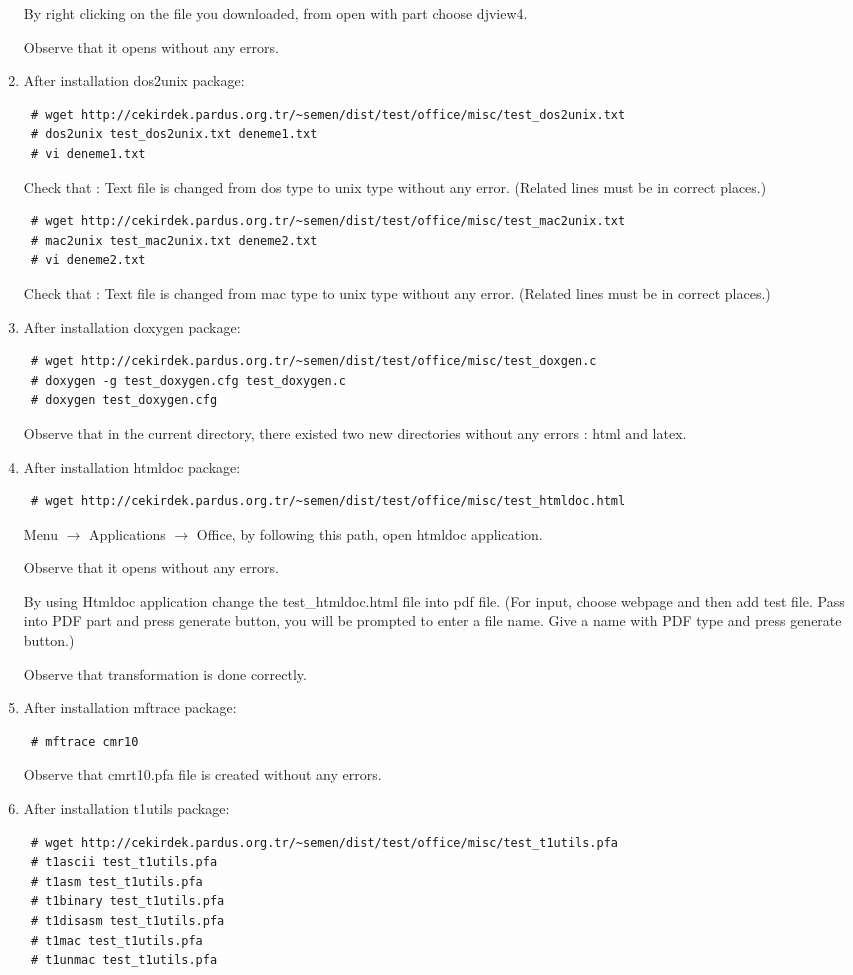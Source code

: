 \documentclass[a4paper,10pt]{article}
\begin{document}
\begin{enumerate}
By right clicking on the file you downloaded, from open with part choose djview4. 

Observe that it opens without any errors.

\item After installation dos2unix package:
\begin{verbatim}
 # wget http://cekirdek.pardus.org.tr/~semen/dist/test/office/misc/test_dos2unix.txt
 # dos2unix test_dos2unix.txt deneme1.txt
 # vi deneme1.txt
\end{verbatim}
Check that : Text file is changed from dos type to unix type without any error. (Related lines must be in  correct places.)

\begin{verbatim}
 # wget http://cekirdek.pardus.org.tr/~semen/dist/test/office/misc/test_mac2unix.txt
 # mac2unix test_mac2unix.txt deneme2.txt
 # vi deneme2.txt
\end{verbatim}
Check that : Text file is changed from mac type to unix type without any error. (Related lines must be in  correct places.)

\item After installation doxygen package:
\begin{verbatim}
 # wget http://cekirdek.pardus.org.tr/~semen/dist/test/office/misc/test_doxgen.c
 # doxygen -g test_doxygen.cfg test_doxygen.c
 # doxygen test_doxygen.cfg
\end{verbatim}

Observe that in the current directory, there existed two new directories without any errors : html and latex.

\item After installation htmldoc package:
\begin{verbatim}
 # wget http://cekirdek.pardus.org.tr/~semen/dist/test/office/misc/test_htmldoc.html
\end{verbatim}

Menu $\rightarrow$ Applications $\rightarrow$ Office, by following this path, open htmldoc application.

Observe that it opens without any errors.

By using Htmldoc application change the test\_htmldoc.html file into pdf file. (For input, choose webpage and then add test file. Pass into PDF part and press generate button, you will be prompted to enter a file name. Give a name with PDF type and press generate button.)
 
Observe that transformation is done correctly.
\item After installation mftrace package:
\begin{verbatim}
 # mftrace cmr10
\end{verbatim}
Observe that cmrt10.pfa file is created without any errors.
\item After installation t1utils package:
\begin{verbatim}
 # wget http://cekirdek.pardus.org.tr/~semen/dist/test/office/misc/test_t1utils.pfa
 # t1ascii test_t1utils.pfa
 # t1asm test_t1utils.pfa
 # t1binary test_t1utils.pfa
 # t1disasm test_t1utils.pfa
 # t1mac test_t1utils.pfa
 # t1unmac test_t1utils.pfa
\end{verbatim}


\end{enumerate}
\end{document}

